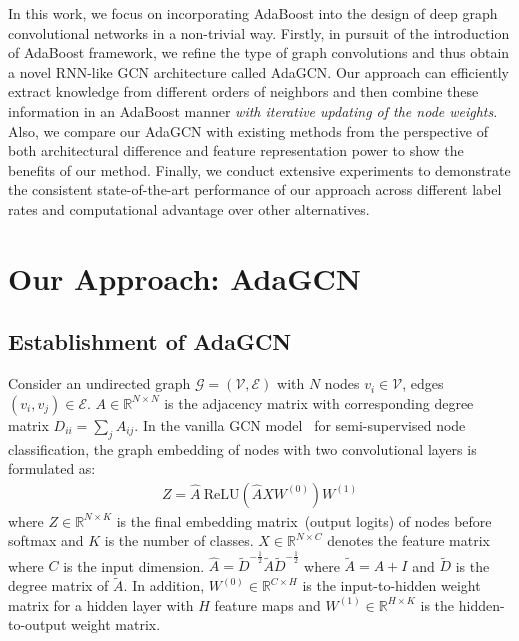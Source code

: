 \documentclass{article} \usepackage{iclr2021_conference,times}
\begin{document}
In this work, we focus on incorporating AdaBoost into the design of deep graph convolutional networks in a non-trivial way. Firstly, in pursuit of the introduction of AdaBoost framework, we refine the type of graph convolutions and thus obtain a novel RNN-like GCN architecture called AdaGCN. Our approach can efficiently extract knowledge from different orders of neighbors and then combine these information in an AdaBoost manner \emph{with iterative updating of the node weights}. Also, we compare our AdaGCN with existing methods from the perspective of both architectural difference and feature representation power to show the benefits of our method. Finally, we conduct  extensive experiments to demonstrate the consistent state-of-the-art performance of our approach across different label rates and computational advantage over other alternatives. 

\section{Our Approach: AdaGCN}

\subsection{Establishment of AdaGCN} \label{approach_establish}
Consider an undirected graph $\mathcal{G}=(\mathcal{V}, \mathcal{E})$ with $N$ nodes $v_i \in \mathcal{V}$, edges $(v_i, v_j) \in \mathcal{E}$. $A \in \mathbb{R}^{N \times N}$ is the adjacency matrix with corresponding degree matrix $D_{ii}=\sum_j A_{ij}$. In the vanilla GCN model~\citep{kipf2016semi} for semi-supervised node classification, the graph embedding of nodes with two convolutional layers is formulated as:
\begin{equation} 	\label{eq_GCN}
\begin{aligned} 
Z=\hat{A} \ \text{ReLU}(\hat{A}XW^{(0)}) W^{(1)}
\end{aligned} \end{equation}
where $Z \in \mathbb{R}^{N \times K}$ is the final embedding matrix~(output logits) of nodes before softmax and $K$ is the number of classes. $X \in \mathbb{R}^{N \times C}$ denotes the feature matrix where $C$ is the input dimension. $\hat{A}=\tilde{D}^{-\frac{1}{2}}\tilde{A}\tilde{D}^{-\frac{1}{2}}$ where $\tilde{A}=A+I$ and $\tilde{D}$ is the degree matrix of $\tilde{A}$. In addition, $W^{(0)}\in \mathbb{R}^{C\times H}$ is the input-to-hidden weight matrix for a hidden layer with $H$ feature maps and $W^{(1)}\in \mathbb{R}^{H\times K}$ is the hidden-to-output weight matrix. 
\end{document}
